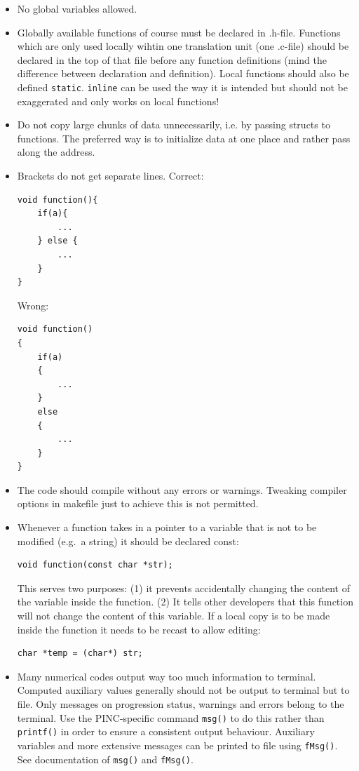 \documentclass[10pt,a4paper]{article}
\begin{document}
\begin{itemize}
	\item No global variables allowed.
	\item Globally available functions of course must be declared in .h-file. Functions which are only used locally wihtin one translation unit (one .c-file) should be declared in the top of that file before any function definitions (mind the difference between declaration and definition). Local functions should also be defined \lstinline$static$. \lstinline$inline$ can be used the way it is intended but should not be exaggerated and only works on local functions!
	\item Do not copy large chunks of data unnecessarily, i.e. by passing structs to functions. The preferred way is to initialize data at one
	place and rather pass along the address.
	\item Brackets do not get separate lines. Correct:
\begin{lstlisting}
void function(){
	if(a){
		...
	} else {
		...
	}
}
\end{lstlisting}
	Wrong:
\begin{lstlisting}
void function()
{
	if(a)
	{
		...
	}
	else
	{
		...
	}
}
\end{lstlisting}
	\item The code should compile without any errors or warnings. Tweaking compiler options in makefile just to achieve this is not permitted.	
	\item Whenever a function takes in a pointer to a variable that is not to be modified (e.g.\ a string) it should be declared const:
	\begin{lstlisting}
void function(const char *str);
	\end{lstlisting}
	This serves two purposes: (1) it prevents accidentally changing the content of the variable inside the function. (2) It tells other developers that this function will not change the content of this variable. If a local copy is to be made inside the function it needs to be recast to allow editing:
	\begin{lstlisting}
char *temp = (char*) str;
	\end{lstlisting}
	\item Many numerical codes output way too much information to terminal. Computed auxiliary values generally should not be output to terminal but to file. Only messages on progression status, warnings and errors belong to the terminal. Use the PINC-specific command \lstinline$msg()$ to do this rather than \lstinline$printf()$ in order to ensure a consistent output behaviour. Auxiliary variables and more extensive messages can be printed to file using \lstinline$fMsg()$. See documentation of \lstinline$msg()$ and \lstinline$fMsg()$.

\end{itemize}
\end{document}
